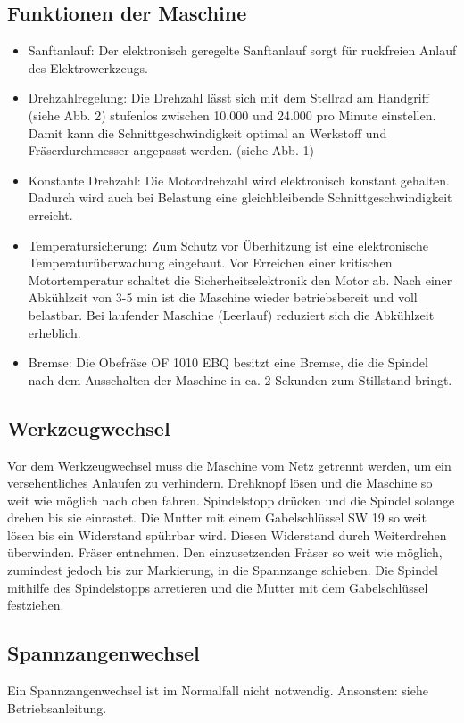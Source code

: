 \documentclass{\basedir/fablab-document}
\begin{document}
\subsection{Funktionen der Maschine}
\begin{itemize}
\item Sanftanlauf: Der elektronisch geregelte Sanftanlauf sorgt für ruckfreien Anlauf des Elektrowerkzeugs.
\item Drehzahlregelung: Die Drehzahl lässt sich mit dem Stellrad am Handgriff (siehe Abb. 2) stufenlos zwischen 10.000 und 24.000 pro Minute einstellen. Damit kann die Schnittgeschwindigkeit optimal an Werkstoff und Fräserdurchmesser angepasst werden. (siehe Abb. 1)
\item Konstante Drehzahl: Die Motordrehzahl wird elektronisch konstant gehalten. Dadurch wird auch bei Belastung eine gleichbleibende Schnittgeschwindigkeit erreicht. 
\item Temperatursicherung: Zum Schutz vor Überhitzung ist eine elektronische Temperaturüberwachung eingebaut. Vor Erreichen einer kritischen Motortemperatur schaltet die Sicherheitselektronik den Motor ab. Nach einer Abkühlzeit von 3-5 min ist die Maschine wieder betriebsbereit und voll belastbar. Bei laufender Maschine (Leerlauf) reduziert sich die Abkühlzeit erheblich.
\item Bremse: Die Obefräse OF 1010 EBQ besitzt eine Bremse, die die Spindel nach dem Ausschalten der Maschine in ca. 2 Sekunden zum Stillstand bringt.
\end{itemize}

\subsection{Werkzeugwechsel}
Vor dem Werkzeugwechsel muss die Maschine vom Netz getrennt werden, um ein versehentliches Anlaufen zu verhindern.
Drehknopf lösen und die Maschine so weit wie möglich nach oben fahren.
Spindelstopp drücken und die Spindel solange drehen bis sie einrastet.
Die Mutter mit einem Gabelschlüssel SW 19 so weit lösen bis ein Widerstand spührbar wird. Diesen Widerstand durch Weiterdrehen überwinden. Fräser entnehmen.
Den einzusetzenden Fräser so weit wie möglich, zumindest jedoch bis zur Markierung, in die Spannzange schieben. Die Spindel mithilfe des Spindelstopps arretieren und die Mutter mit dem Gabelschlüssel festziehen.

\subsection{Spannzangenwechsel}
Ein Spannzangenwechsel ist im Normalfall nicht notwendig. Ansonsten: siehe Betriebsanleitung.
\end{document}
